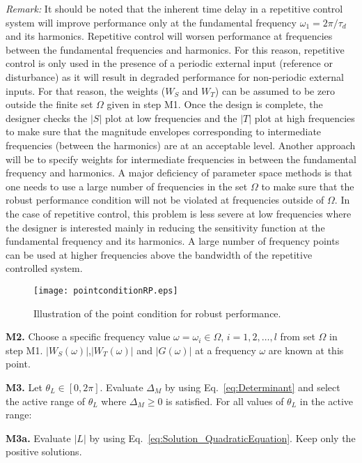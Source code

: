 \documentclass[12pt,draftcls,onecolumn]{IEEEtran}
\begin{document}
\emph{Remark:} It should be noted that the inherent time delay in
a repetitive control system will improve performance only at the
fundamental frequency $\omega_{1}=2\pi/\tau_{d}$ and its
harmonics. Repetitive control will worsen performance at
frequencies between the fundamental frequencies and harmonics. For
this reason, repetitive control is only used in the presence of a
periodic external input (reference or disturbance) as it will
result in degraded performance for non-periodic external inputs.
For that reason, the weights ($W_{S}$ and $W_{T}$) can be assumed
to be zero outside the finite set $\Omega$ given in step M1. Once
the design is complete, the designer checks the $\vert S \vert$ plot at low
frequencies and the $\vert T \vert$ plot at high frequencies to make sure
that the magnitude envelopes corresponding to intermediate
frequencies (between the harmonics) are at an acceptable level.
Another approach will be to specify weights for intermediate
frequencies in between the fundamental frequency and harmonics. A
major deficiency of parameter space methods is that one needs to
use a large number of frequencies in the set $\Omega$ to make sure
that the robust performance condition will not be violated at
frequencies outside of $\Omega$. In the case of repetitive
control, this problem is less severe at low frequencies where the
designer is interested mainly in reducing the sensitivity function
at the fundamental frequency and its harmonics. A large number of
frequency points can be used at higher frequencies above the
bandwidth of the repetitive controlled system.

\begin{figure}\centering
    \texttt{[image: pointconditionRP.eps]}\\
    \caption{Illustration of the point condition for robust performance.}\end{figure}


\textbf{M2.} Choose a specific frequency value $\omega=\omega_{i}\in\Omega$, $i=1,2,\ldots,l$ from set $\Omega$ in step M1. $\vert W_{S}(\omega) \vert$,$\vert W_{T}(\omega) \vert$ and $\vert G(\omega) \vert$ at a frequency $\omega$ are known at this point.

\textbf{M3.} Let $\theta_{L}\in[0,2\pi]$. Evaluate $\Delta_{M}$ by using Eq.~\eqref{eq:Determinant} and select the active range of $\theta_{L}$ where $\Delta_{M}\geq 0$ is satisfied. For all values of $\theta_{L}$ in the active range:

\textbf{M3a.} Evaluate $\vert L \vert$ by using Eq.~\eqref{eq:Solution_QuadraticEquation}. Keep only the positive solutions.
\end{document}
